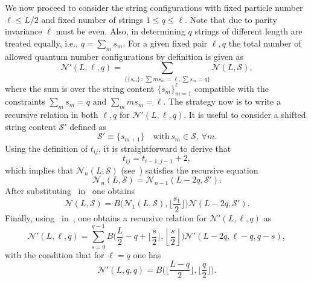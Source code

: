 \documentclass[11pt]{iopart}
\begin{document}
We now proceed to consider the string configurations with fixed particle number $\ell\le 
L/2$ and fixed number of strings $1\le q\le\ell$. Note that due to parity invariance 
$\ell$ must be even. 
Also, in determining $q$ strings of different length are treated equally, i.e., 
$q=\sum_m s_m$. For a given fixed pair 
$\ell,q$ the total number of allowed quantum number configurations by definition is given 
as 
%
\begin{equation}
\label{NLlq}
{\mathcal N}'(L,\ell,q)=\sum\limits_{\{\{s_m\}\,:\, \sum m s_m=\ell, \sum s_m=q\}}
{\mathcal N}(L,{\mathcal S}),
\end{equation}
%
where the sum is over the string content $\{s_m\}_{m=1}^\ell$ compatible with the constraints 
$\sum_m s_m=q$ and $\sum_m m s_m=\ell$. The strategy now is to write a recursive relation 
in both $\ell,q$ for ${\mathcal N}'(L,\ell,q)$. It is useful to consider a shifted string 
content ${\mathcal S}'$ defined as  
%
\begin{equation}
{\mathcal S}'\equiv \{s_{m+1}\}\quad\textrm{with}\, s_m\in{\mathcal S},\,\forall m.
\end{equation}
%
Using the definition of $t_{ij}$, it is straightforward to derive that  
%
\begin{equation}
t_{ij}=t_{i-1,j-1}+2,
\end{equation}
%
which implies that ${\mathcal N}_n(L,{\mathcal S})$ (see~) satisfies the 
recursive equation 
%
\begin{equation}
\label{inter}
{\mathcal N}_n(L,{\mathcal S})={\mathcal N}_{n-1}(L-2q,{\mathcal S}'). 
\end{equation}
%
After substituting~ in~ one obtains 
%
\begin{equation}
\label{NLSr}
{\mathcal N}(L,{\mathcal S})=B\Big({\mathcal N}_1(L,{\mathcal S}),\Big\lfloor 
\frac{s_1}{2}\Big\rfloor\Big){\mathcal N}(L-2q,{\mathcal S}'). 
\end{equation}
%
Finally, using~ in~, one obtains a recursive relation for 
${\mathcal N}'(L,\ell,q)$ as 
%
\begin{equation}
\label{NpLlq}
{\mathcal N}'(L,\ell,q)=\sum_{s=0}^{q-1}B\Big(\frac{L}{2}-q+\Big\lfloor
\frac{s}{2}\Big\rfloor,\left\lfloor\frac{s}{2}\right\rfloor\Big){\mathcal N}'
\left(L-2q,\ell-q,q-s\right), 
\end{equation}
%
with the condition that for $\ell=q$ one has 
%
\begin{equation}
{\mathcal N}'(L,q,q)=B\Big(\Big\lfloor\frac{L-q}{2}\Big\rfloor,\Big\lfloor
\frac{q}{2} \Big\rfloor\Big).
\end{equation}
\end{document}
